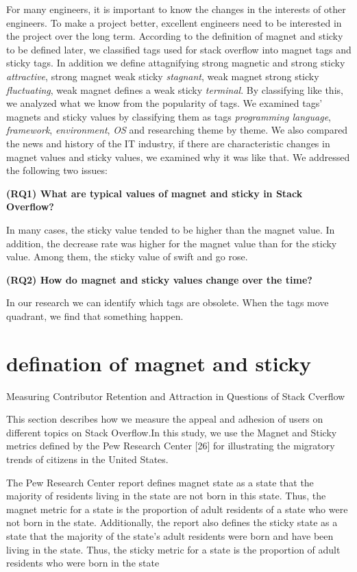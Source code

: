 \documentclass[conference]{IEEEtran}
\begin{document}
\smallskip
For many engineers, it is important to know the changes in the interests of other engineers. To make a project better, excellent engineers need to be interested in the project over the long term. According to the definition of magnet and sticky to be defined later, we classified tags used for stack overflow into magnet tags and sticky tags. In addition we define attagnifying strong magnetic and strong sticky \emph{attractive}, strong magnet weak sticky \emph{stagnant}, weak magnet strong sticky \emph{fluctuating}, weak magnet defines a weak sticky \emph{terminal}. By classifying like this, we analyzed what we know from the popularity of tags. We examined tags' magnets and sticky values by classifying them as tags \emph{programming language}, \emph{framework}, \emph{environment}, \emph{OS} and researching theme by theme. We also compared the news and history of the IT industry, if there are characteristic changes in magnet values and sticky values, we examined why it was like that. We addressed the following two issues:
\par
\smallskip
\textbf{(RQ1) What are typical values of magnet and sticky in Stack Overflow?}\par
In many cases, the sticky value tended to be higher than the magnet value. In addition, the decrease rate was higher for the magnet value than for the sticky value. Among them, the sticky value of swift and go rose.

\textbf{(RQ2) How do magnet and sticky values change over the time?}\par
In our research we can identify which tags are obsolete. When the tags move quadrant, we find that something happen.

\section{defination of magnet and sticky}
Measuring Contributor Retention and Attraction in Questions of Stack Cverflow

This section describes how we measure the appeal and adhesion of users on different topics on Stack Overflow.In this study, we use the Magnet and Sticky metrics defined by the Pew Research Center [26] for illustrating the migratory trends of citizens in the United States.

The Pew Research Center report defines magnet state as a state that the majority of residents living in the state are not born in this state. Thus, the magnet metric for a state is the proportion of adult residents of a state who were not born in the state. Additionally, the report also defines the sticky state as a state that the majority of the state’s adult residents were born and have been living in the state. Thus, the sticky metric for a state is the proportion of adult residents who were born in the state
\end{document}
